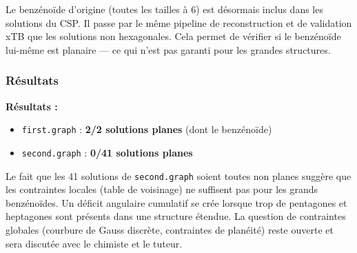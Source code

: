 Le benzénoïde d'origine (toutes les tailles à 6) est désormais inclus dans les solutions du
CSP. Il passe par le même pipeline de reconstruction et de validation xTB que les solutions
non hexagonales. Cela permet de vérifier si le benzénoïde lui-même est planaire — ce qui n'est
pas garanti pour les grandes structures.

\subsubsection{Résultats}

\textbf{Résultats :}
\begin{itemize}
  \item \texttt{first.graph} : \textbf{2/2 solutions planes} (dont le benzénoïde)
  \item \texttt{second.graph} : \textbf{0/41 solutions planes}
\end{itemize}

\begin{remarque}
  Le fait que les 41 solutions de \texttt{second.graph} soient toutes non planes suggère que
  les contraintes locales (table de voisinage) ne suffisent pas pour les grands benzénoïdes.
  Un déficit angulaire cumulatif se crée lorsque trop de pentagones et heptagones sont présents
  dans une structure étendue. La question de contraintes globales (courbure de Gauss discrète,
  contraintes de planéité) reste ouverte et sera discutée avec le chimiste et le tuteur.
\end{remarque}
